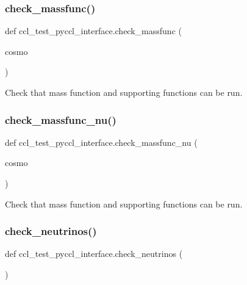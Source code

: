 \subsubsection{\texorpdfstring{check\+\_\+massfunc()}{check\_massfunc()}}
{\footnotesize\ttfamily def ccl\+\_\+test\+\_\+pyccl\+\_\+interface.\+check\+\_\+massfunc (\begin{DoxyParamCaption}\item[{}]{cosmo }\end{DoxyParamCaption})}

\begin{DoxyVerb}Check that mass function and supporting functions can be run.
\end{DoxyVerb}
 \mbox{\label{namespaceccl__test__pyccl__interface_ade98af8ec8a8309c2012c63e9a3766ae}} 
\subsubsection{\texorpdfstring{check\+\_\+massfunc\+\_\+nu()}{check\_massfunc\_nu()}}
{\footnotesize\ttfamily def ccl\+\_\+test\+\_\+pyccl\+\_\+interface.\+check\+\_\+massfunc\+\_\+nu (\begin{DoxyParamCaption}\item[{}]{cosmo }\end{DoxyParamCaption})}

\begin{DoxyVerb}Check that mass function and supporting functions can be run.
\end{DoxyVerb}
 \mbox{\label{namespaceccl__test__pyccl__interface_a45d1e6f91fd168f5b48149bfdfa6aa8b}} 
\subsubsection{\texorpdfstring{check\+\_\+neutrinos()}{check\_neutrinos()}}
{\footnotesize\ttfamily def ccl\+\_\+test\+\_\+pyccl\+\_\+interface.\+check\+\_\+neutrinos (\begin{DoxyParamCaption}{ }\end{DoxyParamCaption})}

